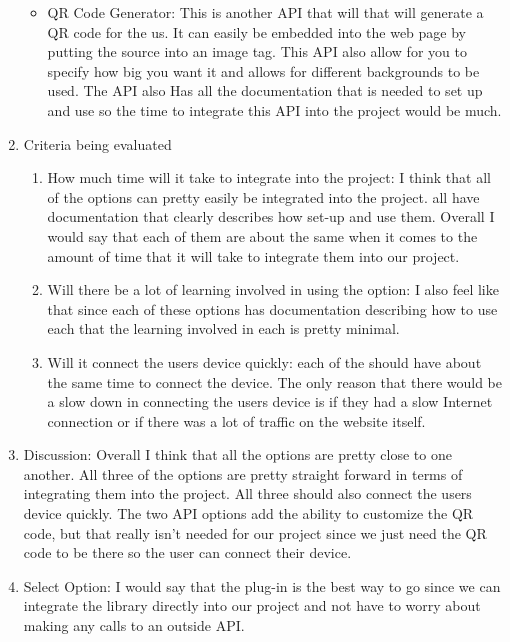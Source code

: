 \documentclass[letterpaper, 10pt, draftclsnofoot, compsoc, onecolumn]{IEEEtran}
\begin{document}
\begin{enumerate}
\begin{itemize}
					\item QR Code Generator: This is another API that will that will generate a QR code for the us. It can easily be embedded into the web page by putting the 
					source into an image tag. This API also allow for you to specify how big you want it and allows for different backgrounds to be used. The API also Has all
					the documentation that is needed to set up and use so the time to integrate this API into the project would be much.  
			\end{itemize}
			\item{Criteria being evaluated}
				\begin{enumerate}
					\item How much time will it take to integrate into the project: I think that all of the options can pretty easily be integrated into the project. all have 
					documentation that clearly describes how set-up and use them. Overall I would say that each of them are about the same when it comes to the 
					amount of time that it will take to integrate them into our project.  
					\item Will there be a lot of learning involved in using the option: I also feel like that since each of these options has documentation describing how to 
					use each that the learning involved in each is pretty minimal. 
					\item Will it connect the users device quickly: each of the should have about the same time to connect the device. The only reason that there would be a 
					slow down in connecting the users device is if they had a slow Internet connection or if there was a lot of traffic on the website itself. 
				\end{enumerate}
			\item{Discussion:} Overall I think that all the options are pretty close to one another. All three of the options are pretty straight forward in terms of integrating them
			into the project.  All three should also connect the users device quickly. The two API options add the ability to customize the QR code, but that really isn't needed for 
			our project since we just need the QR code to be there so the user can connect their device. 
			\item{Select Option:} I would say that the plug-in is the best way to go since we can integrate the library directly into our project and not have to worry about making 
			any calls to an outside API. 
		\end{enumerate}
\end{document}
